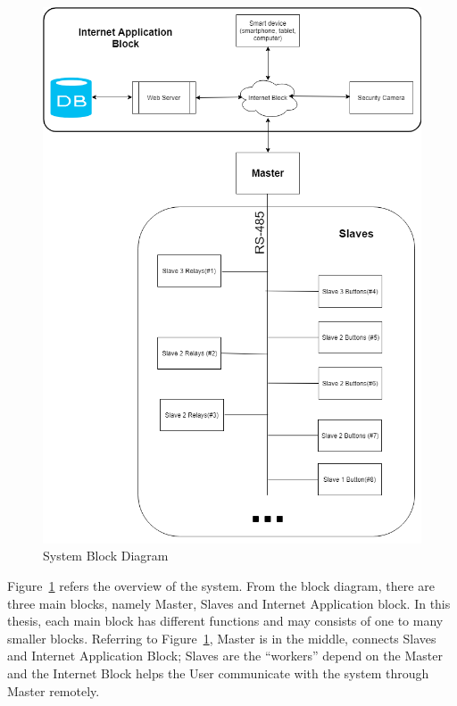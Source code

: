     \begin{figure}[!htp]
        \begin{center}
        \includegraphics[scale=0.55]{images/systemFullBlock.PNG}
        \caption{System Block Diagram}
        \label{fig:blockDiagram}
        \end{center}
    \end{figure}
    Figure~\ref{fig:blockDiagram} refers the overview of the system. From the block diagram, there are three main blocks, namely Master, Slaves and Internet Application block. In this thesis, each main block has different functions and may consists of one to many smaller blocks. Referring to Figure~\ref{fig:blockDiagram}, Master is in the middle, connects Slaves and Internet Application Block; Slaves are the “workers” depend on the Master and the Internet Block helps the User communicate with the system through Master remotely.
